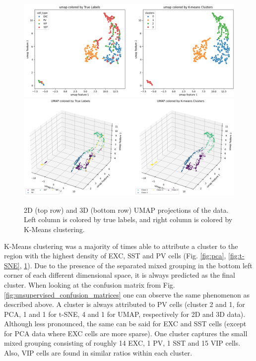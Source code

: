 \documentclass{IEEEtran}
\begin{document}
\begin{figure}[h!]
  \centering
  \includegraphics[width=1\columnwidth]{figures/Compare UMAP 2D.png}
  \includegraphics[width=1\columnwidth]{figures/Compare UMAP 3D.png}
  \caption{2D (top row) and 3D (bottom row) UMAP projections of the data. Left column is colored by true labels, and right column is colored by K-Means clustering.}%
  \label{fig:umap}
\end{figure}

K-Means clustering was a majority of times able to attribute a cluster to the region with the highest density of EXC, SST and PV cells (Fig. \ref{fig:pca}, \ref{fig:t-SNE}, \ref{fig:umap}). Due to the presence of the separated mixed grouping in the bottom left corner of each different dimensional space, it is always predicted as the final cluster.
When looking at the confusion matrix from Fig. \ref{fig:unsupervised_confusion_matrices} one can observe the same phenomenon as described above. A cluster is always attributed to PV cells (cluster 2 and 1, for PCA, 1 and 1 for t-SNE, 4 and 1 for UMAP, respectively for 2D and 3D data). Although less pronounced, the same can be said for EXC and SST cells (except for PCA data where EXC cells are more sparse). One cluster captures the small mixed grouping consisting of roughly 14 EXC, 1 PV, 1 SST and 15 VIP cells. Also, VIP cells are found in similar ratios within each cluster.
\end{document}
